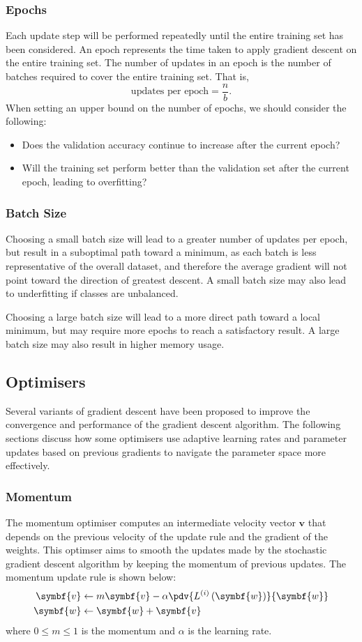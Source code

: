 \documentclass{article}
\begin{document}
\subsubsection{Epochs}
Each update step will be performed repeatedly until the entire training
set has been considered. An epoch represents the time taken to apply
gradient descent on the entire training set. The number of updates in
an epoch is the number of batches required to cover the entire training
set. That is,
\begin{equation*}
    \text{updates per epoch} = \frac{n}{b}.
\end{equation*}
When setting an upper bound on the number of epochs, we should consider
the following:
\begin{itemize}
    \item Does the validation accuracy continue to increase after the
          current epoch?
    \item Will the training set perform better than the validation set
          after the current epoch, leading to overfitting?
\end{itemize}
\subsubsection{Batch Size}
Choosing a small batch size will lead to a greater number of updates
per epoch, but result in a suboptimal path toward a minimum, as each
batch is less representative of the overall dataset, and therefore the
average gradient will not point toward the direction of greatest
descent. A small batch size may also lead to underfitting if classes
are unbalanced.

Choosing a large batch size will lead to a more direct path toward a
local minimum, but may require more epochs to reach a satisfactory
result. A large batch size may also result in higher memory usage.
\subsection{Optimisers}
Several variants of gradient descent have been proposed to improve the
convergence and performance of the gradient descent algorithm. The
following sections discuss how some optimisers use adaptive learning
rates and parameter updates based on previous gradients to navigate the
parameter space more effectively.
\subsubsection{Momentum}
The momentum optimiser computes an intermediate velocity vector
\(\symbf{v}\) that depends on the previous velocity of the update rule
and the gradient of the weights. This optimser aims to smooth the
updates made by the stochastic gradient descent algorithm by keeping
the momentum of previous updates. The momentum update rule is shown
below:
\begin{align*}
    \symbf{v} & \leftarrow m \symbf{v} - \alpha \pdv{L^{\left( i \right)}\left( \symbf{w} \right)}{\symbf{w}} \\
    \symbf{w} & \leftarrow \symbf{w} + \symbf{v}
\end{align*}
where \(0 \leqslant m \leqslant 1\) is the momentum and \(\alpha\) is
the learning rate.
\end{document}
